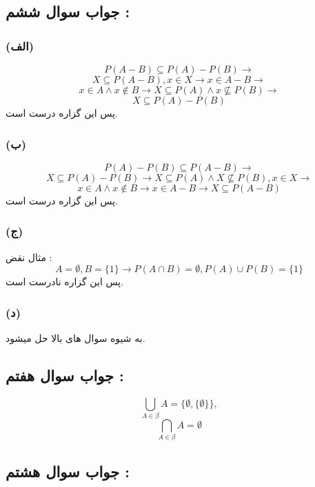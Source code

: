 \documentclass{article}
\begin{document}
        \subsection*{جواب سوال ششم : }
            \subsubsection*{(الف)}
                \[P(A - B) \subseteq P(A) - P(B) \rightarrow\]
                \[X \subseteq P(A - B), x \in X \rightarrow x \in A - B \rightarrow\]
                \[x \in A \land x \not \in B \rightarrow X \subseteq P(A) \land x \not \subseteq P(B) \rightarrow\]
                \[X \subseteq P(A) - P(B)\]
                پس این گزاره درست است.
            
            \subsubsection*{(ب)}
                \[P(A) - P(B) \subseteq P(A - B) \rightarrow\]
                \[X \subseteq P(A) - P(B) \rightarrow X \subseteq P(A) \land X \not \subseteq P(B), x \in X \rightarrow\]
                \[x \in A \land x \not \in B \rightarrow x \in A - B \rightarrow X \subseteq P(A - B)\]
                پس این گزاره درست است.
            
            \subsubsection*{(ج)}
                مثال نقض : \\
                \[A = \emptyset, B= \{1\} \rightarrow P(A \cap B) = \emptyset, P(A) \cup P(B) = \{1\}\]
                پس این گزاره نادرست است.
            
            \subsubsection*{(د)}
                به شیوه سوال های بالا حل میشود.
            
        \subsection*{جواب سوال هفتم :}
            \[\bigcup_{A \in \beta} A = \{\emptyset, \{\emptyset\}\},\]
            \[\bigcap_{A \in \beta} A = \emptyset\]
        
        \subsection*{جواب سوال هشتم : }
\end{document}
